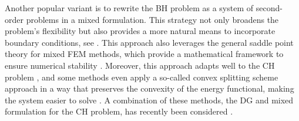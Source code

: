 Another popular variant is to rewrite the BH problem as a system of second-order problems in a mixed formulation. This strategy not only broadens the problem's flexibility but also provides a more natural means to incorporate boundary conditions,
see \cite{falk1978approximation,
ciarlet1974mixed, gudi2008mixed, cheng2000some}. This approach also leverages the general saddle point theory for mixed
FEM methods, which provide a mathematical framework to ensure numerical stability \cite{john2016finite}.
Moreover, this approach adapts well to the CH problem \cite{wells2006discontinuous,feng2004error, valseth2021stable}, and some methods even apply a so-called convex splitting scheme approach in a way that preserves the convexity of the energy functional, making the
system easier to solve \cite{diegel2015analysis, brenner2018robust}.
A combination of these methods, the DG and mixed formulation for the CH problem, has recently been considered \cite{chave2016hybrid, medina2022stabilized}.

